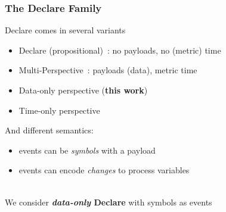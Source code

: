 \documentclass[xcolor=dvipsnames,aspectratio=169]{beamer}
\begin{document}
\begin{frame}
\frametitle{The Declare Family}


Declare comes in several variants

\begin{itemize}
	\item Declare (propositional)~\cite{PesicSA07}: no payloads, no (metric) time
	\item Multi-Perspective~\cite{mp-declare}: payloads (data), metric time
	\item Data-only perspective ({\bf this work})
	\item Time-only perspective
\end{itemize}

And different semantics:
\begin{itemize}
	\item events can be \emph{symbols} with a payload
	\item events can encode \emph{changes} to process variables
\end{itemize}

~\\

We consider {\bf \emph{data-only} Declare} with symbols as events

\end{frame}

\end{document}
